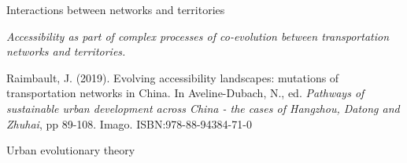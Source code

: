 \documentclass[12pt]{iopart}
\begin{document}









Interactions between networks and territories




\medskip


\textit{Accessibility as part of complex processes of co-evolution between transportation networks and territories.}


\nocite{raimbault2018evolving}


Raimbault, J. (2019). Evolving accessibility landscapes: mutations of transportation networks in China. In Aveline-Dubach, N., ed. \textit{Pathways of sustainable urban development across China - the cases of Hangzhou, Datong and Zhuhai}, pp 89-108. Imago. ISBN:978-88-94384-71-0




Urban evolutionary theory
\end{document}
